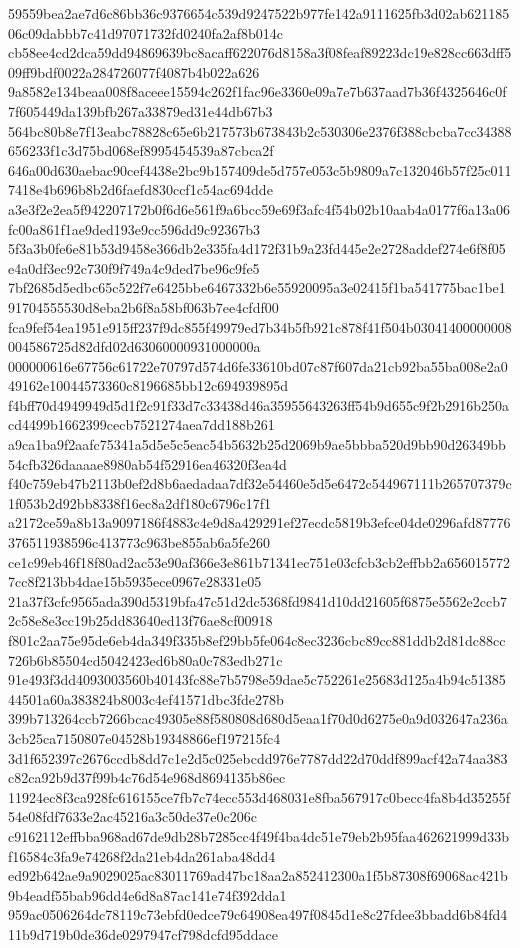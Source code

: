 \documentclass[11pt,a4paper]{article}
\begin{document}
{59559bea2ae7d6c86bb36c9376654c539d9247522b977fe142a9111625fb3d02ab62118506c09dabbb7c41d97071732fd0240fa2af8b014c
cb58ee4cd2dca59dd94869639bc8acaff622076d8158a3f08feaf89223dc19e828cc663dff509ff9bdf0022a284726077f4087b4b022a626
9a8582e134beaa008f8aceee15594c262f1fac96e3360e09a7e7b637aad7b36f4325646c0f7f605449da139bfb267a33879ed31e44db67b3
564bc80b8e7f13eabc78828c65e6b217573b673843b2c530306e2376f388cbcba7cc34388656233f1c3d75bd068ef8995454539a87cbca2f
646a00d630aebac90cef4438e2bc9b157409de5d757e053c5b9809a7c132046b57f25c0117418e4b696b8b2d6faefd830ccf1c54ac694dde
a3e3f2e2ea5f942207172b0f6d6e561f9a6bcc59e69f3afc4f54b02b10aab4a0177f6a13a06fc00a861f1ae9ded193e9cc596dd9c92367b3
5f3a3b0fe6e81b53d9458e366db2e335fa4d172f31b9a23fd445e2e2728addef274e6f8f05e4a0df3ec92c730f9f749a4c9ded7be96c9fe5
7bf2685d5edbc65c522f7e6425bbe6467332b6e55920095a3e02415f1ba541775bac1be191704555530d8eba2b6f8a58bf063b7ee4cfdf00
fca9fef54ea1951e915ff237f9dc855f49979ed7b34b5fb921c878f41f504b03041400000008004586725d82dfd02d63060000931000000a
000000616e67756c61722e70797d574d6fe33610bd07c87f607da21cb92ba55ba008e2a049162e10044573360c8196685bb12c694939895d
f4bff70d4949949d5d1f2c91f33d7c33438d46a35955643263ff54b9d655c9f2b2916b250acd4499b1662399cecb7521274aea7dd188b261
a9ca1ba9f2aafc75341a5d5e5c5eac54b5632b25d2069b9ae5bbba520d9bb90d26349bb54cfb326daaaae8980ab54f52916ea46320f3ea4d
f40c759eb47b2113b0ef2d8b6aedadaa7df32e54460e5d5e6472c544967111b265707379c1f053b2d92bb8338f16ec8a2df180c6796c17f1
a2172ce59a8b13a9097186f4883c4e9d8a429291ef27ecdc5819b3efce04de0296afd87776376511938596c413773c963be855ab6a5fe260
ce1c99eb46f18f80ad2ac53e90af366e3e861b71341ec751e03cfcb3cb2effbb2a6560157727cc8f213bb4dae15b5935ece0967e28331e05
21a37f3cfc9565ada390d5319bfa47c51d2dc5368fd9841d10dd21605f6875e5562e2ccb72c58e8e3cc19b25dd83640ed13f76ae8cf00918
f801c2aa75e95de6eb4da349f335b8ef29bb5fe064c8ec3236cbc89cc881ddb2d81dc88cc726b6b85504cd5042423ed6b80a0c783edb271c
91e493f3dd4093003560b40143fc88e7b5798e59dae5c752261e25683d125a4b94c5138544501a60a383824b8003c4ef41571dbc3fde278b
399b713264ccb7266bcac49305e88f580808d680d5eaa1f70d0d6275e0a9d032647a236a3cb25ca7150807e04528b19348866ef197215fc4
3d1f652397c2676ccdb8dd7c1e2d5c025ebcdd976e7787dd22d70ddf899acf42a74aa383c82ca92b9d37f99b4c76d54e968d8694135b86ec
11924ec8f3ca928fc616155ce7fb7c74ecc553d468031e8fba567917c0becc4fa8b4d35255f54e08fdf7633e2ac45216a3c50de37e0c206c
c9162112effbba968ad67de9db28b7285cc4f49f4ba4dc51e79eb2b95faa462621999d33bf16584c3fa9e74268f2da21eb4da261aba48dd4
ed92b642ae9a9029025ac83011769ad47bc18aa2a852412300a1f5b87308f69068ac421b9b4eadf55bab96dd4e6d8a87ac141e74f392dda1
959ac0506264dc78119c73ebfd0edce79c64908ea497f0845d1e8c27fdee3bbadd6b84fd411b9d719b0de36de0297947cf798dcfd95ddace
}
\end{document}
